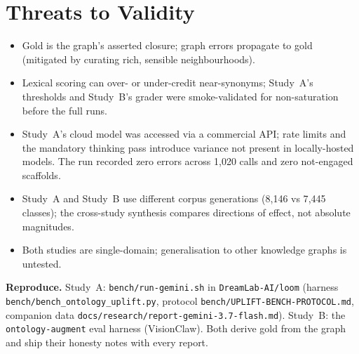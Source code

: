\documentclass[11pt]{article}
\begin{document}
\section{Threats to Validity}
\begin{samepage}
\begin{itemize}[leftmargin=1.3em]
\item Gold is the graph's asserted closure; graph errors propagate to gold (mitigated by curating
      rich, sensible neighbourhoods).
\item Lexical scoring can over- or under-credit near-synonyms; Study~A's thresholds and Study~B's
      grader were smoke-validated for non-saturation before the full runs.
\item Study~A's cloud model was accessed via a commercial API; rate limits and the mandatory
      thinking pass introduce variance not present in locally-hosted models. The run recorded zero
      errors across 1{,}020 calls and zero not-engaged scaffolds.
\item Study~A and Study~B use different corpus generations (8{,}146 vs 7{,}445 classes); the
      cross-study synthesis compares directions of effect, not absolute magnitudes.
\item Both studies are single-domain; generalisation to other knowledge graphs is untested.
\end{itemize}
\end{samepage}

\vspace{0.4cm}
{\small\color{teal0}\textbf{Reproduce.} Study~A: \texttt{bench/run-gemini.sh} in \texttt{DreamLab-AI/loom}
(harness \texttt{bench/bench\_ontology\_uplift.py}, protocol \texttt{bench/UPLIFT-BENCH-PROTOCOL.md},
companion data \texttt{docs/research/report-gemini-3.7-flash.md}). Study~B: the
\texttt{ontology-augment} eval harness (VisionClaw). Both derive gold from the graph and ship
their honesty notes with every report.\par}

\printbibliography[title={References}]
\end{document}
